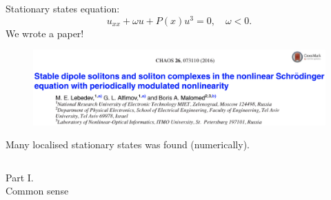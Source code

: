 \documentclass [10pt] {beamer}
\begin{document}
\begin{frame}
\begin{columns}[T]
\begin{column}{.5\textwidth}
			Stationary states equation:
			\begin{equation*}
				u_{xx} + \omega u + P(x) u^3 = 0, \quad \omega < 0.
			\end{equation*}
			We wrote a paper!
			\begin{figure}
			\includegraphics[width = 1\textwidth]{pic/publication.png}
			\end{figure}
			
			Many localised stationary states was found (numerically).
		\end{column}
	\end{columns}
\end{frame}

\begin{frame}
	\begin{center}
		{\Huge Part I.} \\[10pt] {\LARGE Common sense}
	\end{center}
\end{frame}
\end{document}
